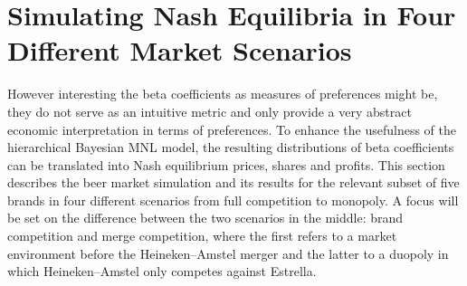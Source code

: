 \documentclass[12pt,a4paper]{article}
\begin{document}
\section{Simulating Nash Equilibria in Four Different Market Scenarios} \label{sec_marketsim}

However interesting the beta coefficients as measures of preferences might be, they do not serve as an intuitive metric and only provide a very abstract economic interpretation in terms of preferences.
To enhance the usefulness of the hierarchical Bayesian MNL model, the resulting distributions of beta coefficients can be translated into Nash equilibrium prices, shares and profits.
This section describes the beer market simulation and its results for the relevant subset of five brands in four different scenarios from full competition to monopoly.
A focus will be set on the difference between the two scenarios in the middle: brand competition and merge competition, where the first refers to a market environment before the Heineken--Amstel merger and the latter to a duopoly in which Heineken--Amstel only competes against Estrella.
\end{document}
